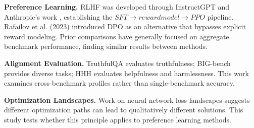
\textbf{Preference Learning.} RLHF was developed through InstructGPT \citep{ouyang2022training} and Anthropic's work \citep{bai2022training}, establishing the $SFT\rightarrow reward model\rightarrow PPO$ pipeline. Rafailov et al. (2023) introduced DPO as an alternative that bypasses explicit reward modeling. Prior comparisons have generally focused on aggregate benchmark performance, finding similar results between methods.

\textbf{Alignment Evaluation.} TruthfulQA \citep{lin2022truthfulqa} evaluates truthfulness; BIG-bench \citep{srivastava2023beyond} provides diverse tasks; HHH evaluates helpfulness and harmlessness. This work examines cross-benchmark profiles rather than single-benchmark accuracy.

\textbf{Optimization Landscapes.} Work on neural network loss landscapes \citep{li2018visualizing} suggests different optimization paths can lead to qualitatively different solutions. This study tests whether this principle applies to preference learning methods.

